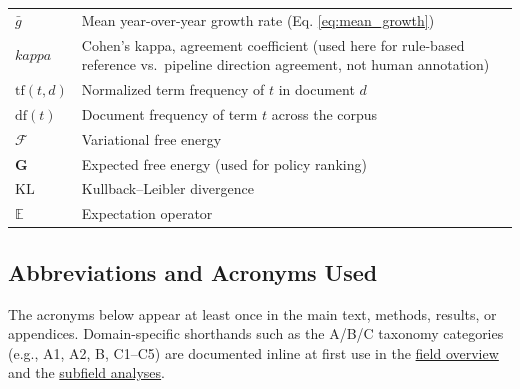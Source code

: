 \documentclass[
  english,
]{article}
\newcommand{\KL}{\mathrm{KL}}
\newcommand{\E}{\mathbb{E}}
\newcommand{\F}{\mathcal{F}}
\begin{document}
\begin{table}[H]
\begin{tabular}{ll}
$\bar{g}$ & Mean year-over-year growth rate (Eq. \ref{eq:mean_growth}) \\
$kappa$ & Cohen's kappa, agreement coefficient (used here for rule-based reference vs.\ pipeline direction agreement, not human annotation) \\
$\text{tf}(t,d)$ & Normalized term frequency of $t$ in document $d$ \\
$\text{df}(t)$ & Document frequency of term $t$ across the corpus \\
$\F$ & Variational free energy \\
$\mathbf{G}$ & Expected free energy (used for policy ranking) \\
$\KL$ & Kullback--Leibler divergence \\
$\E$ & Expectation operator \\
\bottomrule
\end{tabular}
\end{table}

\subsection{Abbreviations and Acronyms
Used}\label{abbreviations-and-acronyms-used}

The acronyms below appear at least once in the main text, methods,
results, or appendices. Domain-specific shorthands such as the A/B/C
taxonomy categories (e.g., A1, A2, B, C1--C5) are documented inline at
first use in the \hyperref[sec:field_overview]{field overview} and the
\hyperref[sec:subfield_analyses]{subfield analyses}.
\end{document}
